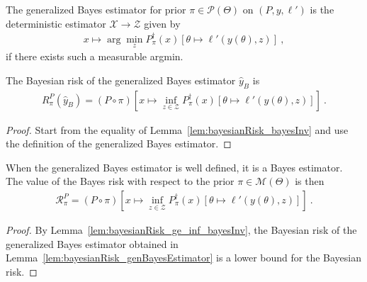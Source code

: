 \begin{definition}
  \label{def:genBayesEstimator}
  \mathlibok
  The generalized Bayes estimator for prior $\pi \in \mathcal P(\Theta)$ on $(P, y, \ell')$ is the deterministic estimator $\mathcal X \to \mathcal Z$ given by
  \begin{align*}
  x \mapsto \arg\min_z P_\pi^\dagger(x)\left[\theta \mapsto \ell'(y(\theta), z)\right] \: ,
  \end{align*}
  if there exists such a measurable argmin.
\end{definition}


\begin{lemma}
  \label{lem:bayesianRisk_genBayesEstimator}
  \mathlibok
  The Bayesian risk of the generalized Bayes estimator $\hat{y}_B$ is
  \begin{align*}
  R^P_\pi(\hat{y}_B) = (P \circ \pi)\left[x \mapsto \inf_{z \in \mathcal Z} P_\pi^\dagger(x) \left[\theta \mapsto \ell'(y(\theta), z)\right]\right]
  \: .
  \end{align*}
\end{lemma}

\begin{proof}\mathlibok
{}
Start from the equality of Lemma~\ref{lem:bayesianRisk_bayesInv} and use the definition of the generalized Bayes estimator.
\end{proof}

\begin{theorem}
  \label{thm:isBayesEstimator_genBayesEstimator}
  \mathlibok
  When the generalized Bayes estimator is well defined, it is a Bayes estimator. The value of the Bayes risk with respect to the prior $\pi \in \mathcal M(\Theta)$ is then
  \begin{align*}
  \mathcal R^P_\pi = (P \circ \pi)\left[x \mapsto \inf_{z \in \mathcal Z} P_\pi^\dagger(x) \left[\theta \mapsto \ell'(y(\theta), z)\right]\right]
  \: .
  \end{align*}
\end{theorem}

\begin{proof}\mathlibok
{}
By Lemma~\ref{lem:bayesianRisk_ge_inf_bayesInv}, the Bayesian risk of the generalized Bayes estimator obtained in Lemma~\ref{lem:bayesianRisk_genBayesEstimator} is a lower bound for the Bayesian risk.
\end{proof}


